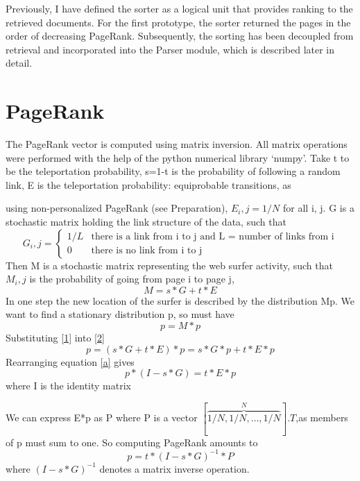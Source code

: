 \documentclass[12pt,notitlepage,twoside]{scrreprt}
\begin{document}
Previously, I have defined the sorter as a logical unit that provides ranking
to the retrieved documents. For the first prototype, the sorter returned the
pages in the order of decreasing PageRank.  Subsequently, the sorting has been
decoupled from retrieval and incorporated into the Parser module, which is
described later in detail.

\section{PageRank} 
The PageRank vector is computed using matrix inversion. All matrix operations
were performed with the help of the python numerical library `numpy'.  Take t
to be the teleportation probability, s=1-t is the probability of following a
random link, E is the teleportation probability: equiprobable transitions, as

using non-personalized PageRank (see Preparation), \(E_i,j = 1/N\) for all i,
j. G is a stochastic matrix holding the link structure of the data, such that 
\begin{equation*}
  G_i,j = \begin{cases}
    1/L & \text{there is a link from i to j and L = number of links from i}\\
    0   & \text{there is no link from i to j}
  \end{cases}
\end{equation*}
Then M is a stochastic matrix representing the web surfer activity, such
that \(M_i,j\) is the probability of going from page i to page j, 
\begin{equation} \label{1}
  M = s*G +t*E
\end{equation}
In one step the new location of the surfer is described by the distribution Mp.
We want to find a stationary distribution p, so must have
\begin{equation}\label{2}
  p = M*p
\end{equation}
Substituting \ref{1} into \ref{2}
\begin{equation} \label{a}
  p = (s*G+t*E)*p = s*G*p + t*E*p
\end{equation}
Rearranging equation \ref{a} gives
\begin{equation}
  p*(I-s*G) = t*E*p
\end{equation}
where I is the identity matrix

We can express E*p as P where P is a vector
\([\overbrace{1/N,1/N,\dots,1/N}^N].T\),as members of p must sum to one.
So computing PageRank amounts to
\begin{equation}
p  = t*(I-s*G)^{-1}*P
\end{equation}
where \((I-s*G)^{-1}\) denotes a matrix inverse operation.
\end{document}
